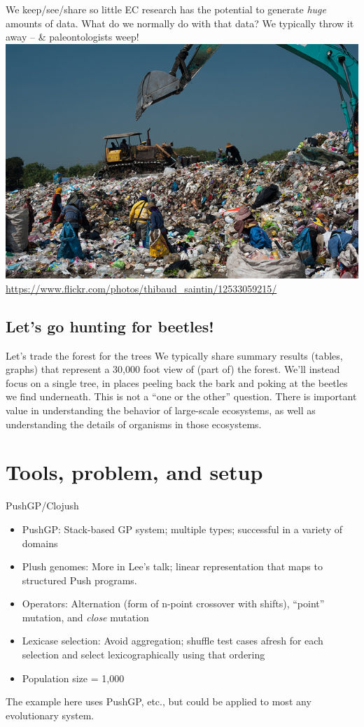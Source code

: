 \documentclass{beamer}
\newcommand{\linespace}{\vskip 0.25cm}
\begin{document}
\begin{frame}{We keep/see/share so little}
			EC research has the potential to generate \emph{huge} amounts of data.
			\linespace
			What do we normally do with that data?
			\linespace
			We typically throw it away -- \& paleontologists weep!
			\linespace
			\centering
			\includegraphics[width = 0.6 \linewidth]{../../figures/Harvest.jpg} \\
			\tiny{\url{https://www.flickr.com/photos/thibaud_saintin/12533059215/}}
\end{frame}

\subsection{Let's go hunting for beetles!}

\begin{frame}{Let's trade the forest for the trees}
	We typically share summary results (tables, graphs) that represent a 30,000 foot view of (part of) the forest.
	\linespace
	We'll instead focus on a single tree, in places peeling back the bark and poking at the beetles we find underneath.
	\linespace
	\linespace
	This is not a ``one or the other'' question. There is important value in understanding
	the behavior of large-scale ecosystems, as well as understanding the details of
	organisms in those ecosystems.
\end{frame}

\section{Tools, problem, and setup}

\begin{frame}{PushGP/Clojush}
	\begin{itemize}
		\item PushGP: Stack-based GP system; multiple types; successful in a variety of domains
		\item Plush genomes: More in Lee's talk; linear representation that maps to structured Push programs.
		\item Operators: Alternation (form of n-point crossover with shifts), ``point'' mutation, and \emph{close} mutation
		\item Lexicase selection: Avoid aggregation; shuffle test cases afresh for each selection and select lexicographically using that ordering
		\item Population size = 1,000
	\end{itemize}
	The example here uses PushGP, etc., but could be applied to most any evolutionary system.
\end{frame}
\end{document}

